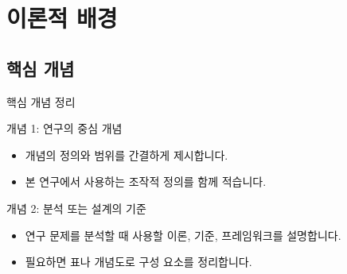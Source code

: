 %

\section{이론적 배경}

\subsection{핵심 개념}

\begin{frame}[t]{핵심 개념 정리}
\small

\begin{block}{개념 1: 연구의 중심 개념}
\begin{itemize}
\tightitems

\item 개념의 정의와 범위를 간결하게 제시합니다.
\item 본 연구에서 사용하는 조작적 정의를 함께 적습니다.
\end{itemize}
\end{block}

\begin{block}{개념 2: 분석 또는 설계의 기준}
\begin{itemize}
\tightitems

\item 연구 문제를 분석할 때 사용할 이론, 기준, 프레임워크를 설명합니다.
\item 필요하면 표나 개념도로 구성 요소를 정리합니다.
\end{itemize}
\end{block}

\end{frame}

